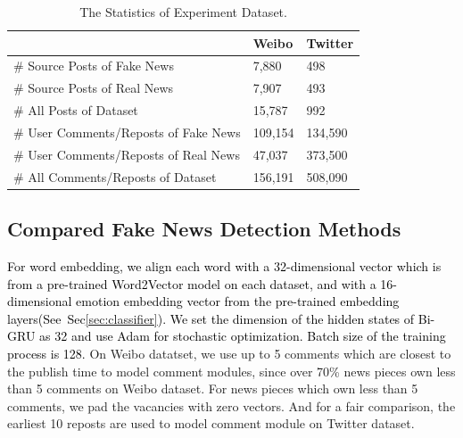 \documentclass[conference]{IEEEtran}
\newcommand{\new}[1]{\textcolor{black}{{#1}}}
\begin{document}
	\begin{table}[!htb]
		\centering
		\begin{tabular}{l l l}
			\toprule
			\ &Weibo & Twitter\\
			\midrule
			\# Source Posts of Fake News& 7,880    & 498   \\
			\# Source Posts of Real News& 7,907    & 493   \\
			\# All Posts of Dataset& 15,787 & 992 \\
			\# User Comments/Reposts of Fake News& 109,154  & 134,590\\
			\# User Comments/Reposts of Real News& 47,037  & 373,500\\
			\# All Comments/Reposts of Dataset& 156,191 &  508,090\\
			\bottomrule
		\end{tabular}
		\caption{The Statistics of Experiment Dataset.}
		\label{tab:dataset}
	\end{table}
	
	\subsection{Compared Fake News Detection Methods}
	\new{For word embedding, we align each word with a 32-dimensional vector which is from a pre-trained Word2Vector model on each dataset, and with a 16-dimensional emotion embedding vector from the pre-trained embedding layers(See~Sec\ref{sec:classifier}). We set the dimension of the hidden states of Bi-GRU as 32 and use Adam\cite{kingma2014adam} for stochastic optimization. Batch size of the training process is 128.} On Weibo datatset, we use up to 5 comments which are closest to the publish time to model comment modules, since over 70\% news pieces own less than 5 comments on Weibo dataset. For news pieces which own less than 5 comments, we pad the vacancies with zero vectors. And for a fair comparison, the earliest 10 reposts are used to model comment module on Twitter dataset. 
	
\end{document}
